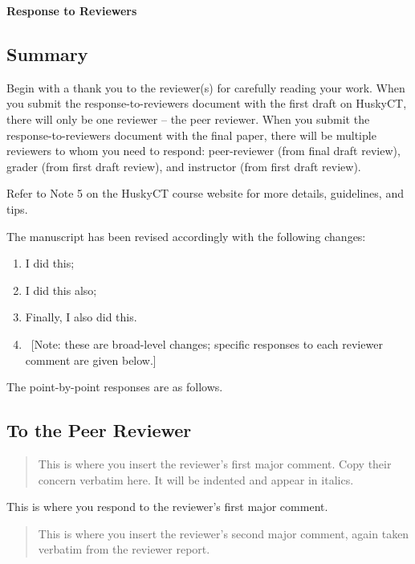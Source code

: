 \documentclass[12pt]{article}
\newenvironment{comment}%
{\begin{quotation}\small\it\noindent\ignorespaces%
}{\end{quotation}}
\begin{document}
\begin{center} \Large \bf
  Response to Reviewers
\end{center}

\subsection*{Summary}

Begin with a thank you to the reviewer(s) for carefully reading your work. When 
you submit the response-to-reviewers document with the first draft on HuskyCT, 
there will only be one reviewer -- the peer reviewer. When you submit the 
response-to-reviewers document with the final paper, there will be multiple 
reviewers to whom you need to respond: peer-reviewer (from final draft review), 
grader (from first draft review), and instructor (from first draft review).  

Refer to Note 5 on the HuskyCT course website for more details, guidelines, and 
tips.

The manuscript has been revised accordingly with the following changes:
\begin{enumerate}
\item I did this;
\item I did this also;
\item Finally, I also did this.  
\item ~[Note: these are broad-level changes; specific responses to each 
reviewer comment are given below.]
\end{enumerate}

The point-by-point responses are as follows.


\subsection*{To the Peer Reviewer}

\begin{comment}
	This is where you insert the reviewer's first major comment. Copy their 
	concern verbatim here. It will be indented and appear in italics.
\end{comment}

This is where you respond to the reviewer's first major comment.

\begin{comment}
	This is where you insert the reviewer's second major comment, again  
	taken verbatim from the reviewer report.  
\end{comment}
\end{document}
